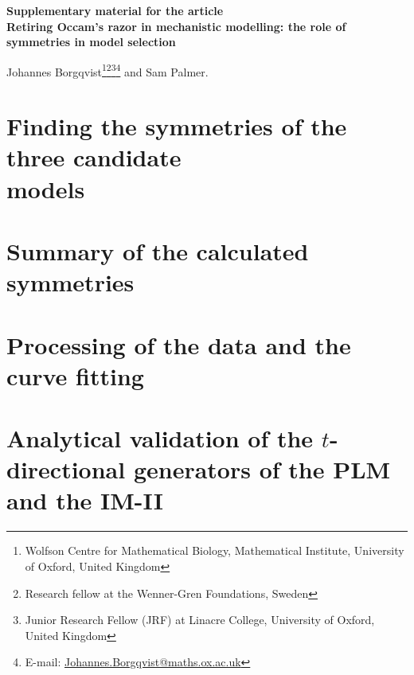 \documentclass[12pt]{article}
\begin{document}
\begin{titlepage}
  \Large \textbf{Supplementary material for the article}\\[1cm]
  \Huge \textbf{Retiring Occam's razor in mechanistic modelling: the role of symmetries in model selection}\\[1cm]\normalsize

 \vspace{3.0cm}
        \setcounter{footnote}{1}
       Johannes Borgqvist\footnote{\label{Oxford}Wolfson Centre for Mathematical Biology, Mathematical Institute, University of Oxford, United Kingdom}\footnote{\label{WennerGren} Research fellow at the Wenner-Gren Foundations, Sweden}\footnote{\label{Linacre} Junior Research Fellow (JRF) at Linacre College, University of Oxford, United Kingdom}\footnote{E-mail: \url{Johannes.Borgqvist@maths.ox.ac.uk}} and Sam Palmer.


  
\end{titlepage}

       \renewcommand*{\thefootnote}{\arabic{footnote}}
        \setcounter{footnote}{0}
\tableofcontents
\listoffigures
\listoftables
\newpage




\section{Finding the symmetries of the three candidate\\models}



\section{Summary of the calculated symmetries}



\section{Processing of the data and the curve fitting}




\section{Analytical validation of the $t$-directional generators of the PLM and the IM-II}
\end{document}
